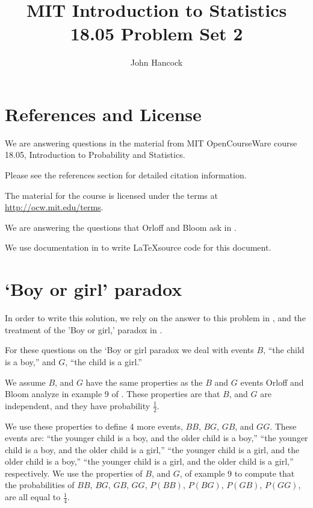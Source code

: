 \documentclass[a4paper,11pt]{article}
\author{John Hancock}
\title{MIT Introduction to Statistics 18.05 Problem Set 2 }
\begin{document}
\maketitle
\tableofcontents
\section{References and License}
We are answering questions in the material from MIT OpenCourseWare
course 18.05, Introduction to Probability and Statistics.

Please see the references section for detailed citation information.

The material for the course is licensed under the terms at 
\url{http://ocw.mit.edu/terms}.

We are answering the questions that Orloff and Bloom ask in
\cite{probSet2}.

We use documentation in \cite{latexSpecialChars} \cite{latexCases} to 
write \LaTeX source code for this document.

\section{`Boy or girl' paradox}

In order to write this solution, we rely on the answer to this problem
in \cite{probSet2Ans}, and the treatment of the 'Boy or girl,' paradox
in \cite{boyGirlWiki}.

For these questions on the `Boy or girl paradox we deal with events
$B$, ``the child is a boy,'' and $G$, ``the child is a girl.''

We assume $B$, and $G$ have the same properties as the $B$ and $G$
events Orloff and Bloom analyze in example 9 of \cite{reading4}.
These properties are that $B$, and $G$ are independent, and they have
probability $\frac{1}{2}$.

We use these properties to define 4 more events, $BB$, $BG$, $GB$,
and $GG$.  These events are: ``the younger child is a boy, and the older
child is a boy,'' ``the younger child is a boy, and the older child is a
girl,'' ``the younger child is a girl, and the older child is a boy,''
``the younger child is a girl, and the older child is a girl,'' 
respectively.  We use the properties of $B$, and $G$, of example 9 to
compute that the probabilities of $BB$, $BG$, $GB$, $GG$, 
$P\left( BB \right)$, $P\left( BG \right)$, $P\left( GB \right)$, 
$P\left( GG \right)$, are all equal to $\frac{1}{4}$.
\end{document}
